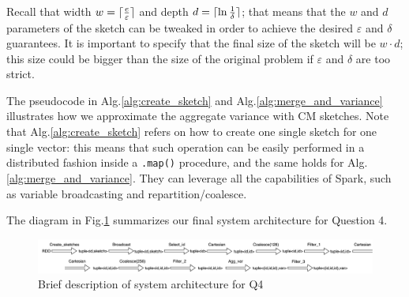 \begin{corollary}
Recall that width $w=\lceil {\frac{e}{\varepsilon}} \rceil$ and depth $d=\lceil {\ln{\frac{1}{\delta}}} \rceil$; that means that the $w$ and $d$ parameters of the sketch can be tweaked in order to achieve the desired $\varepsilon$ and $\delta$ guarantees. It is important to specify that the final size of the sketch will be $w \cdot d$; this size could be bigger than the size of the original problem if $\varepsilon$ and $\delta$ are too strict.
\end{corollary}

The pseudocode in Alg.\ref{alg:create_sketch} and Alg.\ref{alg:merge_and_variance} illustrates how we approximate the aggregate variance with CM sketches. Note that Alg.\ref{alg:create_sketch} refers on how to create one single sketch for one single vector: this means that such operation can be easily performed in a distributed fashion inside a \texttt{.map()} procedure, and the same holds for Alg.\ref{alg:merge_and_variance}. They can leverage all the capabilities of Spark, such as variable broadcasting and repartition/coalesce.

\begin{minipage}[t]{.5\textwidth}
\null 
    
\end{minipage}%
\begin{minipage}[t]{.5\textwidth}
\null
    
\end{minipage}

The diagram in Fig.\ref{fig:q4_diagram} summarizes our final system architecture for Question 4.

\begin{figure}[!h]
    \centering
    \includegraphics[width=.95\linewidth]{../assets/images/q4_diagram.png}
    \caption{Brief description of system architecture for Q4}
    \label{fig:q4_diagram}
\end{figure}


